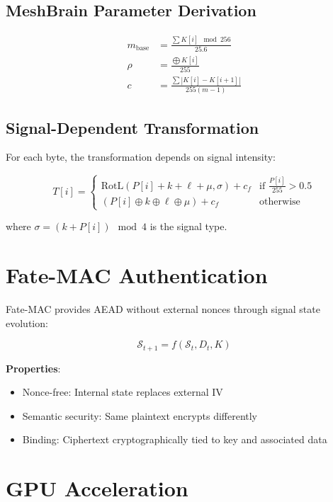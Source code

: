 \documentclass[11pt,a4paper]{article}
\begin{document}
\subsection{MeshBrain Parameter Derivation}

\begin{align}
m_{\text{base}} &= \frac{\sum K[i] \mod 256}{25.6} \\
\rho &= \frac{\bigoplus K[i]}{255} \\
c &= \frac{\sum |K[i] - K[i+1]|}{255(m-1)}
\end{align}

\subsection{Signal-Dependent Transformation}

For each byte, the transformation depends on signal intensity:

\begin{equation}
T[i] = \begin{cases}
\text{RotL}(P[i] + k + \ell + \mu, \sigma) + c_f & \text{if } \frac{P[i]}{255} > 0.5 \\
(P[i] \oplus k \oplus \ell \oplus \mu) + c_f & \text{otherwise}
\end{cases}
\end{equation}

where $\sigma = (k + P[i]) \mod 4$ is the signal type.

\section{Fate-MAC Authentication}

Fate-MAC provides AEAD without external nonces through signal state evolution:

\begin{equation}
\mathcal{S}_{t+1} = f(\mathcal{S}_t, D_t, K)
\end{equation}

\textbf{Properties}:
\begin{itemize}
    \item Nonce-free: Internal state replaces external IV
    \item Semantic security: Same plaintext encrypts differently
    \item Binding: Ciphertext cryptographically tied to key and associated data
\end{itemize}

\section{GPU Acceleration}
\end{document}
